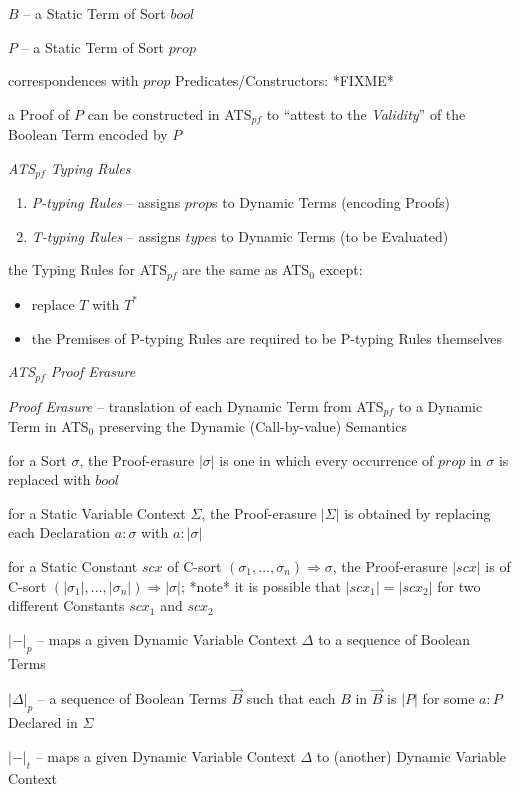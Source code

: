 $B$ -- a Static Term of Sort $bool$

$P$ -- a Static Term of Sort $prop$

correspondences with $prop$ Predicates/Constructors: *FIXME*

a Proof of $P$ can be constructed in ATS$_{pf}$ to ``attest to the
\emph{Validity}'' of the Boolean Term encoded by $P$


\emph{ATS$_{pf}$ Typing Rules}

\begin{enumerate}
\item \emph{P-typing Rules} -- assigns $prop$s to Dynamic Terms
  (encoding Proofs)
\item \emph{T-typing Rules} -- assigns $type$s to Dynamic Terms (to be
  Evaluated)
\end{enumerate}

the Typing Rules for ATS$_{pf}$ are the same as ATS$_0$ except:
\begin{itemize}
\item replace $T$ with $T^*$
\item the Premises of P-typing Rules are required to be P-typing Rules
  themselves
\end{itemize}


\emph{ATS$_{pf}$ Proof Erasure}

\emph{Proof Erasure} -- translation of each Dynamic Term from
ATS$_{pf}$ to a Dynamic Term in ATS$_0$ preserving the Dynamic
(Call-by-value) Semantics

for a Sort $\sigma$, the Proof-erasure $|\sigma|$ is one in which
every occurrence of $prop$ in $\sigma$ is replaced with $bool$

for a Static Variable Context $\Sigma$, the Proof-erasure $|\Sigma|$
is obtained by replacing each Declaration $a:\sigma$ with $a:|\sigma|$

for a Static Constant $scx$ of C-sort $(\sigma_1,...,\sigma_n)
\Rightarrow \sigma$, the Proof-erasure $|scx|$ is of C-sort
$(|\sigma_1|,...,|\sigma_n|) \Rightarrow |\sigma|$; *note* it is
possible that $|scx_1| = |scx_2|$ for two different Constants $scx_1$
and $scx_2$

$|-|_p$ -- maps a given Dynamic Variable Context $\Delta$ to a
sequence of Boolean Terms

$|\Delta|_p$ -- a sequence of Boolean Terms $\vec{B}$ such that each
$B$ in $\vec{B}$ is $|P|$ for some $a:P$ Declared in $\Sigma$

$|-|_t$ -- maps a given Dynamic Variable Context $\Delta$ to (another)
Dynamic Variable Context

